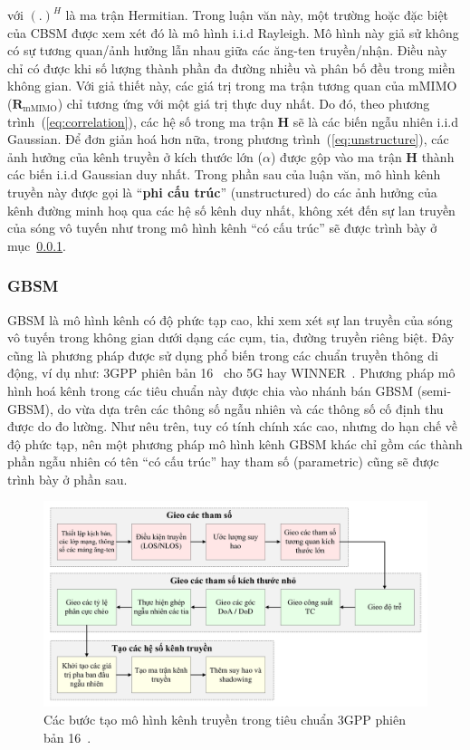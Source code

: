với $(.)^H$ là ma trận Hermitian. Trong luận văn này, một trường hoặc đặc biệt của CBSM được xem xét đó là mô hình i.i.d Rayleigh. Mô hình này giả sử không có sự tương quan/ảnh hưởng lẫn nhau giữa các ăng-ten truyền/nhận. Điều này chỉ có được khi số lượng thành phần đa đường nhiều và phân bố đều trong miền không gian. Với giả thiết này, các giá trị trong ma trận tương quan của mMIMO ($\mathbf{R}_{\text{mMIMO}}$) chỉ tương ứng với một giá trị thực duy nhất. Do đó, theo phương trình~(\ref{eq:correlation}), các hệ số trong ma trận $\mathbf{H}$ sẽ là các biến ngẫu nhiên i.i.d Gaussian. Để đơn giản hoá hơn nữa, trong phương trình~(\ref{eq:unstructure}), các ảnh hưởng của kênh truyền ở kích thước lớn ($\alpha$) được gộp vào ma trận $\mathbf{H}$ thành các biến i.i.d Gaussian duy nhất. Trong phần sau của luận văn, mô hình kênh truyền này được gọi là ``\textbf{phi cấu trúc}'' (unstructured) do các ảnh hưởng của kênh đường minh hoạ qua các hệ số kênh duy nhất, không xét đến sự lan truyền của sóng vô tuyến như trong mô hình kênh ``có cấu trúc'' sẽ được trình bày ở mục~\ref{sec:GBSM}.

\subsubsection{GBSM}
\label{sec:GBSM}

GBSM là mô hình kênh có độ phức tạp cao, khi xem xét sự lan truyền của sóng vô tuyến trong không gian dưới dạng các cụm, tia, đường truyền riêng biệt. Đây cũng là phương pháp được sử dụng phổ biến trong các chuẩn truyền thông di động, ví dụ như: 3GPP phiên bản 16~\cite{r16} cho 5G hay WINNER~\cite{WINNER}. Phương pháp mô hình hoá kênh trong các tiêu chuẩn này được chia vào nhánh bán GBSM (semi-GBSM), do vừa dựa trên các thông số ngẫu nhiên và các thông số cố định thu được do đo lường. Như nêu trên, tuy có tính chính xác cao, nhưng do hạn chế về độ phức tạp, nên một phương pháp mô hình kênh GBSM khác chỉ gồm các thành phần ngẫu nhiên có tên ``có cấu trúc'' hay tham số (parametric) cũng sẽ được trình bày ở phần sau.

\begin{figure}
    \centering
    \includegraphics[width=\linewidth]{figures/3GPP_flow.pdf}
    \caption{Các bước tạo mô hình kênh truyền trong tiêu chuẩn 3GPP phiên bản 16~\cite{r16}.}
    \label{fig:3gpp_flow}
\end{figure}

